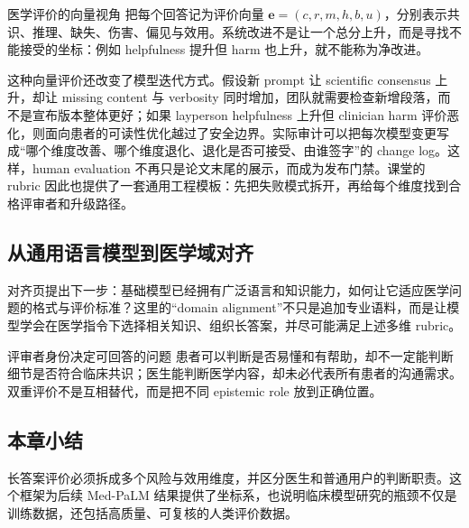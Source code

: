 \begin{importantbox}{医学评价的向量视角}
把每个回答记为评价向量 $\mathbf{e}=(c,r,m,h,b,u)$，分别表示共识、推理、缺失、伤害、偏见与效用。系统改进不是让一个总分上升，而是寻找不能接受的坐标：例如 helpfulness 提升但 harm 也上升，就不能称为净改进。
\end{importantbox}

这种向量评价还改变了模型迭代方式。假设新 prompt 让 scientific consensus 上升，却让 missing content 与 verbosity 同时增加，团队就需要检查新增段落，而不是宣布版本整体更好；如果 layperson helpfulness 上升但 clinician harm 评价恶化，则面向患者的可读性优化越过了安全边界。实际审计可以把每次模型变更写成“哪个维度改善、哪个维度退化、退化是否可接受、由谁签字”的 change log。这样，human evaluation 不再只是论文末尾的展示，而成为发布门禁。课堂的 rubric 因此也提供了一套通用工程模板：先把失败模式拆开，再给每个维度找到合格评审者和升级路径。

\subsection{从通用语言模型到医学域对齐}

对齐页提出下一步：基础模型已经拥有广泛语言和知识能力，如何让它适应医学问题的格式与评价标准？这里的“domain alignment”不只是追加专业语料，而是让模型学会在医学指令下选择相关知识、组织长答案，并尽可能满足上述多维 rubric。



\begin{warningbox}{评审者身份决定可回答的问题}
患者可以判断是否易懂和有帮助，却不一定能判断细节是否符合临床共识；医生能判断医学内容，却未必代表所有患者的沟通需求。双重评价不是互相替代，而是把不同 epistemic role 放到正确位置。
\end{warningbox}

\subsection{本章小结}

长答案评价必须拆成多个风险与效用维度，并区分医生和普通用户的判断职责。这个框架为后续 Med-PaLM 结果提供了坐标系，也说明临床模型研究的瓶颈不仅是训练数据，还包括高质量、可复核的人类评价数据。


